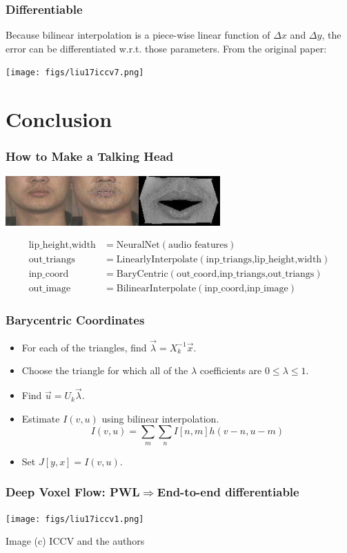 \documentclass{beamer}
\begin{document}
\begin{frame}
  \frametitle{Differentiable}

  Because bilinear interpolation is a piece-wise linear function of
  $\Delta x$ and $\Delta y$, the error can be differentiated
  w.r.t. those parameters.  From the original paper:
  \centerline{\texttt{[image: figs/liu17iccv7.png]}}
\end{frame}
    

\section{Conclusion}
\setcounter{subsection}{1}

\begin{frame}
  \frametitle{How to Make a Talking Head}
  \centerline{\includegraphics[height=0.75in]{mp7_image_warping_points.jpg}\includegraphics[height=0.75in]{mp7_image_warped.jpg}}
  \begin{align*}
    \mbox{lip\_height,width} &= \mbox{NeuralNet}\left(\mbox{audio features}\right)\\
    \mbox{out\_triangs} &= \mbox{LinearlyInterpolate}\left(\mbox{inp\_triangs,lip\_height,width}\right)\\
    \mbox{inp\_coord} &= \mbox{BaryCentric}\left(\mbox{out\_coord,inp\_triangs,out\_triangs}\right)\\
    \mbox{out\_image} &= \mbox{BilinearInterpolate}\left(\mbox{inp\_coord,inp\_image}\right)
  \end{align*}
\end{frame}

\begin{frame}
  \frametitle{Barycentric Coordinates}

  \begin{itemize}
  \item For each of the triangles, find $\vec\lambda=X_k^{-1}\vec{x}$.
  \item Choose the triangle for which all of the $\lambda$ coefficients
    are $0\le\lambda\le 1$.
  \item Find $\vec{u}=U_k\vec\lambda$.
  \item Estimate $I(v,u)$ using bilinear interpolation.
    \[
    I(v,u) = \sum_m\sum_n I[n,m] h(v-n,u-m)
    \]    
  \item Set $J[y,x]=I(v,u)$.
  \end{itemize}
\end{frame}

\begin{frame}
  \frametitle{Deep Voxel Flow: PWL$\Rightarrow$End-to-end differentiable}

  \centerline{\texttt{[image: figs/liu17iccv1.png]}}
  \begin{small}Image (c) ICCV and the authors\end{small}
\end{frame}
\end{document}

